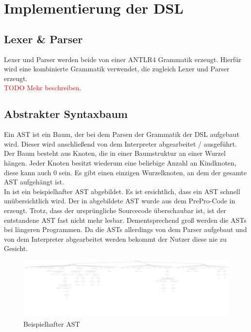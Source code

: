
\chapter{Implementierung der DSL}

\section{Lexer \& Parser}
Lexer und Parser werden beide von einer ANTLR4 Grammatik erzeugt.
Hierfür wird eine kombinierte Grammatik verwendet, die zugleich Lexer und Parser erzeugt.\\
\textcolor{red}{TODO Mehr beschreiben.}

\section{Abstrakter Syntaxbaum}
Ein \ac{AST} ist ein Baum, der bei dem Parsen der Grammatik der \ac{DSL} aufgebaut wird.
Dieser wird anschließend von dem Interpreter abgearbeitet / ausgeführt.\\
Der Baum besteht aus Knoten, die in einer Baumstruktur an einer Wurzel hängen.
Jeder Knoten besitzt wiederum eine beliebige Anzahl an Kindknoten, diese kann auch 0 sein.
Es gibt einen einzigen Wurzelknoten, an dem der gesamte \ac{AST} aufgehängt ist.\\
In  ist ein beispielhafter \ac{AST} abgebildet.
Es ist ersichtlich, dass ein \ac{AST} schnell unübersichtlich wird.
Der in  abgebildete \ac{AST} wurde aus dem PrePro-Code in  erzeugt.
Trotz, dass der ursprüngliche Sourcecode überschaubar ist, ist der entstandene \ac{AST} fast nicht mehr lesbar.
Dementsprechend groß werden die \acp{AST} bei längeren Programmen.
Da die \acp{AST} allerdings von dem Parser aufgebaut und von dem Interpreter abgearbeitet werden bekommt der Nutzer diese nie zu Gesicht.
\begin{figure}[H]
	\centering
	\includegraphics[width=\textwidth]{figures/parseTree}
	\caption{Beispielhafter \ac{AST}}
	\label{fig:AST_Example}
\end{figure}

